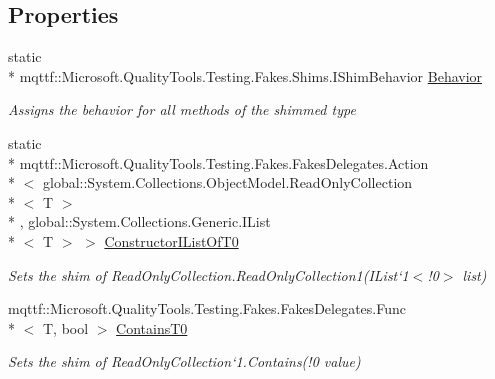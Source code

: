 \subsection*{Properties}
\begin{DoxyCompactItemize}
\item 
static \\*
mqttf\-::\-Microsoft.\-Quality\-Tools.\-Testing.\-Fakes.\-Shims.\-I\-Shim\-Behavior \hyperlink{class_system_1_1_collections_1_1_object_model_1_1_fakes_1_1_shim_read_only_collection_3_01_t_01_4_a9d9093b1ca1572d5f1de513f28f2caca}{Behavior}
\begin{DoxyCompactList}\small\item\em Assigns the behavior for all methods of the shimmed type\end{DoxyCompactList}\item 
static \\*
mqttf\-::\-Microsoft.\-Quality\-Tools.\-Testing.\-Fakes.\-Fakes\-Delegates.\-Action\\*
$<$ global\-::\-System.\-Collections.\-Object\-Model.\-Read\-Only\-Collection\\*
$<$ T $>$\\*
, global\-::\-System.\-Collections.\-Generic.\-I\-List\\*
$<$ T $>$ $>$ \hyperlink{class_system_1_1_collections_1_1_object_model_1_1_fakes_1_1_shim_read_only_collection_3_01_t_01_4_a86463206313af50f1d187b2c6cbd6a85}{Constructor\-I\-List\-Of\-T0}
\begin{DoxyCompactList}\small\item\em Sets the shim of Read\-Only\-Collection{.\-Read\-Only\-Collection}1(I\-List`1$<$!0$>$ list)\end{DoxyCompactList}\item 
mqttf\-::\-Microsoft.\-Quality\-Tools.\-Testing.\-Fakes.\-Fakes\-Delegates.\-Func\\*
$<$ T, bool $>$ \hyperlink{class_system_1_1_collections_1_1_object_model_1_1_fakes_1_1_shim_read_only_collection_3_01_t_01_4_aef45a9e906e9fe94d886f05bf2aeb6ab}{Contains\-T0}
\begin{DoxyCompactList}\small\item\em Sets the shim of Read\-Only\-Collection`1.Contains(!0 value)\end{DoxyCompactList}\item 

\end{DoxyCompactItemize}
